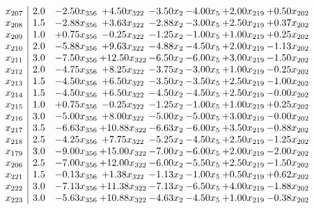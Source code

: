 \documentclass[8pt]{article}
\begin{document}
\[\begin{array}{c| c c@{\hskip 2pt} c@{\hskip 2pt} c@{\hskip 2pt} c@{\hskip 2pt} c@{\hskip 2pt} c@{\hskip 2pt} }
 x_{207}   &  2.0 & -2.50 x_{356} & +  4.50 x_{322} & -3.50 x_{2} & -4.00 x_{5} & +  2.00 x_{219} & +  0.50 x_{202}\\
 x_{208}   &  1.5 & -2.88 x_{356} & +  3.63 x_{322} & -2.88 x_{2} & -3.00 x_{5} & +  2.50 x_{219} & +  0.37 x_{202}\\
 x_{209}   &  1.0 & +  0.75 x_{356} & -0.25 x_{322} & -1.25 x_{2} & -1.00 x_{5} & +  1.00 x_{219} & +  0.25 x_{202}\\
 x_{210}   &  2.0 & -5.88 x_{356} & +  9.63 x_{322} & -4.88 x_{2} & -4.50 x_{5} & +  2.00 x_{219} & -1.13 x_{202}\\
 x_{211}   &  3.0 & -7.50 x_{356} & + 12.50 x_{322} & -6.50 x_{2} & -6.00 x_{5} & +  3.00 x_{219} & -1.50 x_{202}\\
 x_{212}   &  2.0 & -4.75 x_{356} & +  8.25 x_{322} & -3.75 x_{2} & -3.00 x_{5} & +  1.00 x_{219} & -0.25 x_{202}\\
 x_{213}   &  1.5 & -4.50 x_{356} & +  6.50 x_{322} & -3.50 x_{2} & -3.50 x_{5} & +  2.50 x_{219} & -1.00 x_{202}\\
 x_{214}   &  1.5 & -4.50 x_{356} & +  6.50 x_{322} & -4.50 x_{2} & -4.50 x_{5} & +  2.50 x_{219} & -0.00 x_{202}\\
 x_{215}   &  1.0 & +  0.75 x_{356} & -0.25 x_{322} & -1.25 x_{2} & -1.00 x_{5} & +  1.00 x_{219} & +  0.25 x_{202}\\
 x_{216}   &  3.0 & -5.00 x_{356} & +  8.00 x_{322} & -5.00 x_{2} & -5.00 x_{5} & +  3.00 x_{219} & -0.00 x_{202}\\
 x_{217}   &  3.5 & -6.63 x_{356} & + 10.88 x_{322} & -6.63 x_{2} & -6.00 x_{5} & +  3.50 x_{219} & -0.88 x_{202}\\
 x_{218}   &  2.5 & -4.25 x_{356} & +  7.75 x_{322} & -5.25 x_{2} & -4.50 x_{5} & +  2.50 x_{219} & -1.25 x_{202}\\
 x_{179}   &  3.0 & -9.00 x_{356} & + 15.00 x_{322} & -7.00 x_{2} & -6.00 x_{5} & +  2.00 x_{219} & -2.00 x_{202}\\
 x_{206}   &  2.5 & -7.00 x_{356} & + 12.00 x_{322} & -6.00 x_{2} & -5.50 x_{5} & +  2.50 x_{219} & -1.50 x_{202}\\
 x_{221}   &  1.5 & -0.13 x_{356} & +  1.38 x_{322} & -1.13 x_{2} & -1.00 x_{5} & +  0.50 x_{219} & +  0.62 x_{202}\\
 x_{222}   &  3.0 & -7.13 x_{356} & + 11.38 x_{322} & -7.13 x_{2} & -6.50 x_{5} & +  4.00 x_{219} & -1.88 x_{202}\\
 x_{223}   &  3.0 & -5.63 x_{356} & + 10.88 x_{322} & -4.63 x_{2} & -4.50 x_{5} & +  1.00 x_{219} & -0.38 x_{202}\\

\end{array}\]
\end{document}
